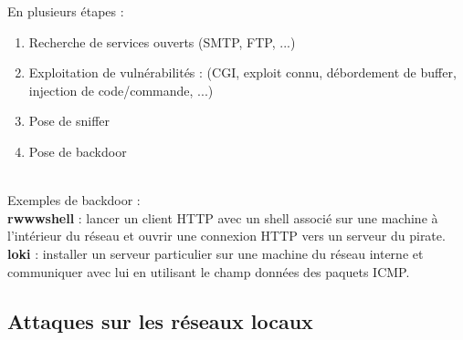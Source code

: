 \documentclass[journal, a4paper]{IEEEtran}
\begin{document}
		En plusieurs étapes :
		\begin{enumerate}
			\item Recherche de services ouverts (SMTP, FTP, ...)
			\item Exploitation de vulnérabilités : (CGI, exploit connu, débordement de buffer, injection de code/commande, ...)
			\item Pose de sniffer
			\item Pose de backdoor
		\end{enumerate}
		~\\
		Exemples de backdoor :\\
		\textbf{rwwwshell} : lancer un client HTTP avec un shell associé sur une machine à l'intérieur du réseau et ouvrir une connexion HTTP vers un serveur du pirate.\\
		\textbf{loki} : installer un serveur particulier sur une machine du réseau interne et communiquer avec lui en utilisant le champ données des paquets ICMP.
		
	\subsection{Attaques sur les réseaux locaux}
		
	
		

	
\end{document}
